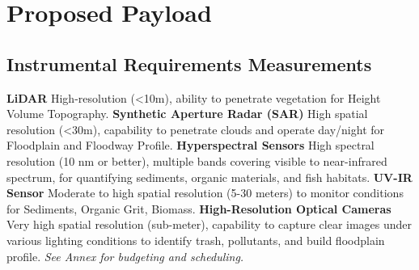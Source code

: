 \section{Proposed Payload}
\subsection{Instrumental Requirements Measurements}

    \textbf{LiDAR} High-resolution (<10m), ability to penetrate vegetation for Height Volume Topography.
    \textbf{Synthetic Aperture Radar (SAR)} High spatial resolution (<30m), capability to penetrate clouds and operate day/night for Floodplain and Floodway Profile.
    \textbf{Hyperspectral Sensors} High spectral resolution (10 nm or better), multiple bands covering visible to near-infrared spectrum, for quantifying sediments, organic materials, and fish habitats.
    \textbf{UV-IR Sensor} Moderate to high spatial resolution (5-30 meters) to monitor conditions for Sediments, Organic Grit, Biomass.
    \textbf{High-Resolution Optical Cameras} Very high spatial resolution (sub-meter), capability to capture clear images under various lighting conditions to identify trash, pollutants, and build floodplain profile. \textit{See Annex for budgeting and scheduling.}